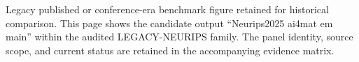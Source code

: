 Legacy published or conference-era benchmark figure retained for historical comparison. This page shows the candidate output ``Neurips2025 ai4mat em main'' within the audited LEGACY-NEURIPS family. The panel identity, source scope, and current status are retained in the accompanying evidence matrix.
